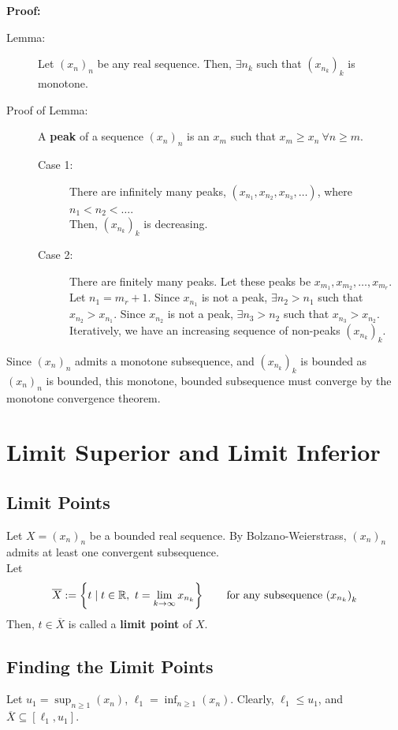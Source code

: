 \documentclass[10pt]{extarticle}
\newcommand{\R}{\mathbb{R}}
\begin{document}
    \textbf{Proof:}
    \begin{description}
      \item[Lemma:] Let $(x_n)_n$ be any real sequence. Then, $\exists n_k$ such that $(x_{n_k})_k$ is monotone.
      \item[Proof of Lemma:] A \textbf{peak} of a sequence $(x_n)_n$ is an $x_m$ such that $x_m \geq x_n~\forall n\geq m$.
      \begin{description}
        \item[Case 1:] There are infinitely many peaks, $(x_{n_1}, x_{n_2},x_{n_3},\dots)$, where $n_1 < n_2<\dots$.\\

          Then, $(x_{n_k})_k$ is decreasing.
        \item[Case 2:] There are finitely many peaks. Let these peaks be $x_{m_1},x_{m_2},\dots,x_{m_r}$.\\

          Let $n_1 = m_r + 1$. Since $x_{n_1}$ is not a peak, $\exists n_2 > n_1$ such that $x_{n_2} > x_{n_1}$. Since $x_{n_2}$ is not a peak, $\exists n_3 > n_2$ such that $x_{n_3} > x_{n_2}$.\\

          Iteratively, we have an increasing sequence of non-peaks $(x_{n_k})_k$.
      \end{description}
    \end{description}
    Since $(x_n)_n$ admits a monotone subsequence, and $(x_{n_k})_k$ is bounded as $(x_n)_n$ is bounded, this monotone, bounded subsequence must converge by the monotone convergence theorem.
  \section{Limit Superior and Limit Inferior}%
  \subsection{Limit Points}%
    Let $X = (x_n)_n$ be a bounded real sequence. By Bolzano-Weierstrass, $(x_n)_n$ admits at least one convergent subsequence.\\

    Let
    \begin{align*}
      \overline{X} := \left\{t \mid t\in\R,~t = \lim_{k\rightarrow\infty}x_{n_k}\right\} \tag*{for any subsequence $\left(x_{n_k}\right)_k$}
    \end{align*}
    Then, $t\in\overline{X}$ is called a \textbf{limit point} of $X$.
    \subsection{Finding the Limit Points}%
    Let $u_1 = \sup_{n\geq 1}(x_n)$, $\ell_1 = \inf_{n\geq 1}(x_n)$. Clearly, $\ell_1 \leq u_1$, and $\overline{X} \subseteq [\ell_1,u_1]$.\\
\end{document}
